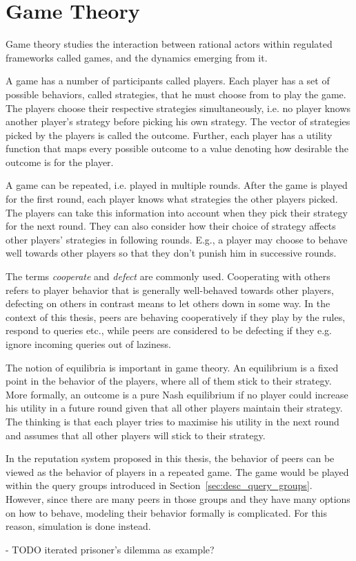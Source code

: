 \section{Game Theory}
Game theory studies the interaction between rational actors within regulated
frameworks called games, and the dynamics emerging from it.

A game has a number of participants called players. Each player has a set of
possible behaviors, called strategies, that he must choose from to play the
game. The players choose their respective strategies simultaneously, i.e. no
player knows another player's strategy before picking his own strategy. The
vector of strategies picked by the players is called the outcome. Further, each
player has a utility function that maps every possible outcome to a value
denoting how desirable the outcome is for the player.

A game can be repeated, i.e. played in multiple rounds. After the game is played
for the first round, each player knows what strategies the other players picked.
The players can take this information into account when they pick their strategy
for the next round. They can also consider how their choice of strategy affects
other players' strategies in following rounds. E.g., a player may choose to
behave well towards other players so that they don't punish him in successive
rounds.

The terms \emph{cooperate} and \emph{defect} are commonly used. Cooperating with
others refers to player behavior that is generally well-behaved towards other
players, defecting on others in contrast means to let others down in some way.
In the context of this thesis, peers are behaving cooperatively if they play by
the rules, respond to queries etc., while peers are considered to be defecting
if they e.g. ignore incoming queries out of laziness.

The notion of equilibria is important in game theory. An equilibrium is a fixed
point in the behavior of the players, where all of them stick to their strategy.
More formally, an outcome is a pure Nash equilibrium if no player could increase
his utility in a future round given that all other players maintain their
strategy. The thinking is that each player tries to maximise his utility in the
next round and assumes that all other players will stick to their strategy.

In the reputation system proposed in this thesis, the behavior of peers can be
viewed as the behavior of players in a repeated game. The game would be played
within the query groups introduced in Section~\ref{sec:desc_query_groups}.
However, since there are many peers in those groups and they have many options
on how to behave, modeling their behavior formally is complicated. For this
reason, simulation is done instead.

- TODO iterated prisoner's dilemma as example?
